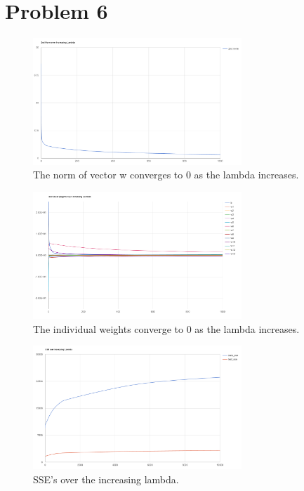 \documentclass[journal]{IEEEtran}
\begin{document}
\section{Problem 6}
\begin{figure}[!h]
\centering
\captionsetup{justification=centering,margin=2cm}
\includegraphics[width=0.7\textwidth]{norm_lambda.PNG}
\caption{\label{norm}The norm of vector w converges to 0 as the lambda increases.}
\end{figure}
\begin{figure}[!h]
\centering
\captionsetup{justification=centering,margin=2cm}
\includegraphics[width=0.7\textwidth]{weights_lambda.PNG}
\caption{\label{weights}The individual weights converge to 0 as the lambda increases.}
\end{figure}
\medskip
\begin{figure}[!h]
\centering
\captionsetup{justification=centering,margin=2cm}
\includegraphics[width=0.7\textwidth]{sse_lambda.PNG}
\caption{\label{sse}SSE's over the increasing lambda.}
\end{figure}
\smallskip
\noindent 
\medskip
\end{document}
